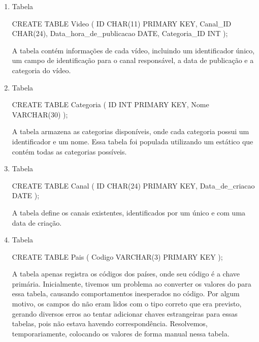 \begin{enumerate}
  \item Tabela 

  \begin{code}
    CREATE TABLE Video (
      ID CHAR(11) PRIMARY KEY,
      Canal_ID CHAR(24),
      Data_hora_de_publicacao DATE,
      Categoria_ID INT
    );
  \end{code}

  A tabela  contém informações de cada vídeo, incluindo um identificador único, um campo de identificação para o canal responsável, a data de publicação e a categoria do vídeo.

  \item Tabela 

  \begin{code}
    CREATE TABLE Categoria (
      ID INT PRIMARY KEY,
      Nome VARCHAR(30)
    );
  \end{code}

  A tabela  armazena as categorias disponíveis, onde cada categoria possui um identificador e um nome. Essa tabela foi populada utilizando um  estático que contém todas as categorias possíveis.

  \item Tabela 

  \begin{code}
    CREATE TABLE Canal (
      ID CHAR(24) PRIMARY KEY,
      Data_de_criacao DATE
    );
  \end{code}

    A tabela  define os canais existentes, identificados por um  único e com uma data de criação.

  \item Tabela 

  \begin{code}
    CREATE TABLE Pais (
      Codigo VARCHAR(3) PRIMARY KEY
    );
  \end{code}

  A tabela  apenas registra os códigos dos países, onde seu código é a chave primária. Inicialmente, tivemos um problema ao converter os valores do  para essa tabela, causando comportamentos inesperados no código. Por algum motivo, os campos do  não eram lidos com o tipo correto que era previsto, gerando diversos erros ao tentar adicionar chaves estrangeiras para essas tabelas, pois não estava havendo correspondência. Resolvemos, temporariamente, colocando os valores de forma manual nessa tabela.


\end{enumerate}
